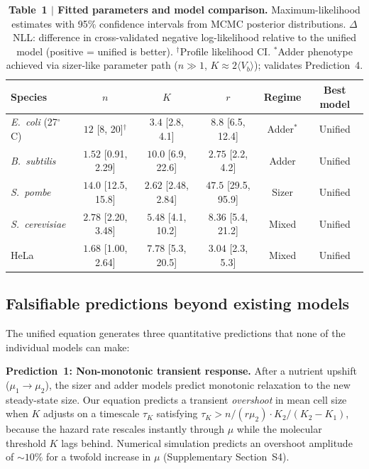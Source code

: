 \documentclass[11pt]{article}
\newcommand{\Ecoli}{\textit{E.~coli}}
\newcommand{\Spombe}{\textit{S.~pombe}}
\newcommand{\Scerevisiae}{\textit{S.~cerevisiae}}
\newcommand{\Bsubtilis}{\textit{B.~subtilis}}
\begin{document}
\begin{table}[H]
\centering
\caption{\textbf{Table~1 $|$ Fitted parameters and model comparison.}
Maximum-likelihood estimates with 95\% confidence intervals from
MCMC posterior distributions.  $\Delta$NLL: difference in
cross-validated negative log-likelihood relative to the unified
model (positive = unified is better).
$^\dagger$Profile likelihood CI.
$^*$Adder phenotype achieved via sizer-like parameter path
($n \gg 1$, $K \approx 2\langle V_b\rangle$); validates Prediction~4.}
\small
\begin{tabular}{lccccc}
\toprule
\textbf{Species} & $n$ & $K$ & $r$ & \textbf{Regime}
  & \textbf{Best model} \\
\midrule
\Ecoli{} (27$^\circ$C)
  & $12$ {\scriptsize[8, 20]$^\dagger$}
  & $3.4$ {\scriptsize[2.8, 4.1]}
  & $8.8$ {\scriptsize[6.5, 12.4]}
  & Adder$^*$ & Unified \\
\Bsubtilis{}
  & $1.52$ {\scriptsize[0.91, 2.29]}
  & $10.0$ {\scriptsize[6.9, 22.6]}
  & $2.75$ {\scriptsize[2.2, 4.2]}
  & Adder & Unified \\
\Spombe{}
  & $14.0$ {\scriptsize[12.5, 15.8]}
  & $2.62$ {\scriptsize[2.48, 2.84]}
  & $47.5$ {\scriptsize[29.5, 95.9]}
  & Sizer & Unified \\
\Scerevisiae{}
  & $2.78$ {\scriptsize[2.20, 3.48]}
  & $5.48$ {\scriptsize[4.1, 10.2]}
  & $8.36$ {\scriptsize[5.4, 21.2]}
  & Mixed & Unified \\
HeLa
  & $1.68$ {\scriptsize[1.00, 2.64]}
  & $7.78$ {\scriptsize[5.3, 20.5]}
  & $3.04$ {\scriptsize[2.3, 5.3]}
  & Mixed & Unified \\
\bottomrule
\end{tabular}
\label{tab:params}
\end{table}

\subsection*{Falsifiable predictions beyond existing models}

The unified equation generates three quantitative predictions that
none of the individual models can make:

\textbf{Prediction~1: Non-monotonic transient response.}
After a nutrient upshift ($\mu_1 \to \mu_2$), the sizer and adder
models predict monotonic relaxation to the new steady-state size.
Our equation predicts a transient \emph{overshoot} in mean cell size
when $K$ adjusts on a timescale $\tau_K$ satisfying
$\tau_K > n/(r\mu_2) \cdot K_2/(K_2 - K_1)$, because the hazard rate
rescales instantly through $\mu$ while the molecular threshold $K$
lags behind.  Numerical simulation predicts an overshoot amplitude
of ${\sim}10\%$ for a twofold increase in $\mu$
(Supplementary Section~S4).
\end{document}
